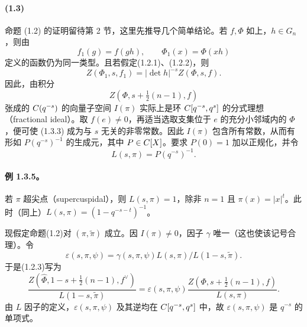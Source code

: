 \paragraph*{(1.3)} 命题 (1.2) 的证明留待第 2 节，这里先推导几个简单结论。若 $f,\Phi$ 如上，$h\in G_n$，则由
\begin{equation}
 f_1(g)=f(gh),\qquad\Phi_1(x)=\Phi(xh)\tag{1.3.1}
\end{equation}
定义的函数仍为同一类型。且若假定(1.2.1)、(1.2.2)，则
\begin{equation}
 Z(\Phi_1,s,f_1)=|\det h|^{-s}Z(\Phi,s,f).\tag{1.3.2}
\end{equation}
因此，由积分
\begin{equation}
 Z(\Phi,s+\tfrac12(n-1),f)\tag{1.3.3}
\end{equation}
张成的 $C(q^{-s})$ 的向量子空间 $I(\pi)$ 实际上是环 $C[q^{-s},q^s]$ 的分式理想（fractional ideal）。取 $f(e)\neq0$，再适当选取支集位于 $e$ 的充分小邻域内的 $\Phi$，便可使 (1.3.3) 成为与 $s$ 无关的非零常数。因此 $I(\pi)$ 包含所有常数，从而有形如 $P(q^{-s})^{-1}$ 的生成元，其中 $P\in C[X]$。要求 $P(0)=1$ 加以正规化，并令
\begin{equation}
 L(s,\pi)=P(q^{-s})^{-1}.\tag{1.3.4}
\end{equation}
\paragraph*{例 1.3.5。}
若 $\pi$ 超尖点（supercuspidal），则 $L(s,\pi)=1$，除非 $n=1$ 且 $\pi(x)=|x|^t$。此时（同上）$L(s,\pi)=(1-q^{-s-t})^{-1}$。

现假定命题(1.2)对 $(\pi,\widetilde\pi)$ 成立。因 $I(\pi)\neq0$，因子 $\gamma$ 唯一（这也使该记号合理）。令
\begin{equation}
 \varepsilon(s,\pi,\psi)=\gamma(s,\pi,\psi)L(s,\pi)/L(1-s,\widetilde\pi).\tag{1.3.6}
\end{equation}
于是(1.2.3)写为
\begin{equation}
 \frac{Z(\widehat\Phi,1-s+\tfrac12(n-1),f^\vee)}{L(1-s,\widetilde\pi)}
 =\varepsilon(s,\pi,\psi)\frac{Z(\Phi,s+\tfrac12(n-1),f)}{L(s,\pi)}.\tag{1.3.7}
\end{equation}
由 $L$ 因子的定义，$\varepsilon(s,\pi,\psi)$ 及其逆均在 $C[q^{-s},q^s]$ 中，故 $\varepsilon(s,\pi,\psi)$ 是 $q^{-s}$ 的单项式。

